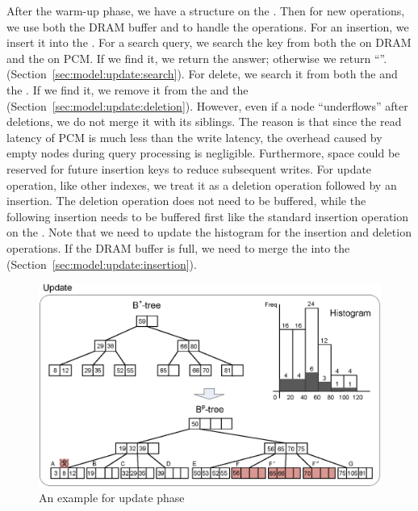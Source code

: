 After the warm-up phase,
we have a \bptree structure on the \pcm.
Then for new operations,
we use both the DRAM buffer and
\bptree to handle the operations.
For an insertion, we insert it into the \bplustree.
For a search query,
we search the key from both the \bplustree on DRAM and the \bptree on PCM.
If we find it, we return the answer; otherwise we return ``\emptyrst''. (Section~\ref{sec:model:update:search}).
For delete, we search it from both the \bplustree and the \bptree.
If we find it, we remove it from the \bplustree and the \bptree (Section~\ref{sec:model:update:deletion}).
However, even if a node ``underflows'' after deletions, we do not merge it with its siblings. The reason is that since the read latency of PCM is much less
than the write latency, the overhead caused by empty nodes during
query processing is negligible. Furthermore, space could be reserved
for future insertion keys to reduce subsequent writes.
For update operation, like other indexes, we treat it as a deletion operation followed by an insertion.
The deletion operation does not need to be buffered, while the following insertion needs to be buffered first like the standard insertion operation on the \bptree.
Note that we need to update the histogram for the insertion and deletion operations.
If the DRAM buffer is full, we need to merge the \bplustree into the \bptree (Section~\ref{sec:model:update:insertion}).


\begin{figure}[!t]
\centering
\includegraphics[scale=0.85]{figs/update.eps}
\caption{An example for update phase}
\label{fig:ex:update}
\end{figure}

